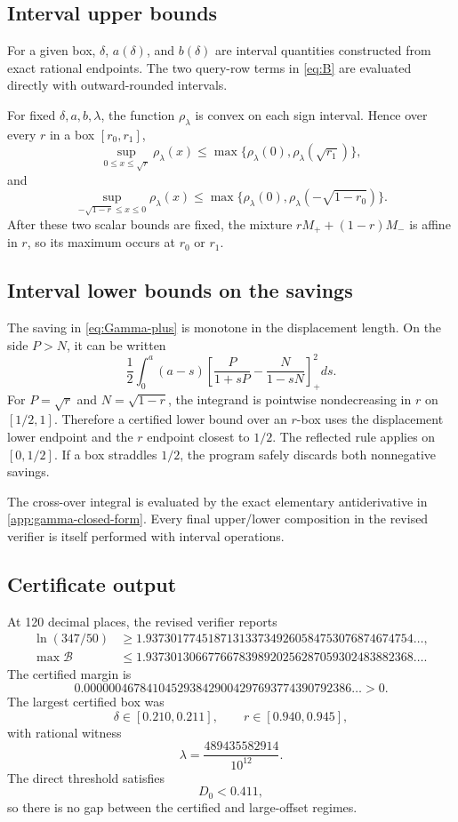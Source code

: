 \documentclass[11pt]{article}
\theoremstyle{definition}
\begin{document}
\subsection{Interval upper bounds}
For a given box, $\delta$, $a(\delta)$, and $b(\delta)$ are interval quantities constructed from exact rational endpoints.  The two query-row terms in \cref{eq:B} are evaluated directly with outward-rounded intervals.

For fixed $\delta,a,b,\lambda$, the function $\rho_\lambda$ is convex on each sign interval.  Hence over every $r$ in a box $[r_0,r_1]$,
\[
  \sup_{0\le x\le\sqrt r}\rho_\lambda(x)
  \le\max\{\rho_\lambda(0),\rho_\lambda(\sqrt{r_1})\},
\]
and
\[
  \sup_{-\sqrt{1-r}\le x\le0}\rho_\lambda(x)
  \le\max\{\rho_\lambda(0),\rho_\lambda(-\sqrt{1-r_0})\}.
\]
After these two scalar bounds are fixed, the mixture $rM_++(1-r)M_-$ is affine in $r$, so its maximum occurs at $r_0$ or $r_1$.

\subsection{Interval lower bounds on the savings}
The saving in \cref{eq:Gamma-plus} is monotone in the displacement length.  On the side $P>N$, it can be written
\[
  \frac12\int_0^a(a-s)
  \left[\frac{P}{1+sP}-\frac{N}{1-sN}\right]_+^2ds.
\]
For $P=\sqrt r$ and $N=\sqrt{1-r}$, the integrand is pointwise nondecreasing in $r$ on $[1/2,1]$.  Therefore a certified lower bound over an $r$-box uses the displacement lower endpoint and the $r$ endpoint closest to $1/2$.  The reflected rule applies on $[0,1/2]$.  If a box straddles $1/2$, the program safely discards both nonnegative savings.

The cross-over integral is evaluated by the exact elementary antiderivative in \cref{app:gamma-closed-form}.  Every final upper/lower composition in the revised verifier is itself performed with interval operations.

\subsection{Certificate output}
At 120 decimal places, the revised verifier reports
\begin{align*}
  \ln(347/50)&\ge
  1.9373017745187131337349260584753076874674754\ldots,\\
  \max\mathcal B&\le
  1.9373013066776678398920256287059302483882368\ldots.
\end{align*}
The certified margin is
\begin{equation}
  \boxed{
  0.0000004678410452938429004297693774390792386\ldots>0.
  }
  \label{eq:margin}
\end{equation}
The largest certified box was
\[
  \delta\in[0.210,0.211],
  \qquad
  r\in[0.940,0.945],
\]
with rational witness
\[
  \lambda=\frac{489435582914}{10^{12}}.
\]
The direct threshold satisfies
\[
  D_0<0.411,
\]
so there is no gap between the certified and large-offset regimes.
\end{document}

